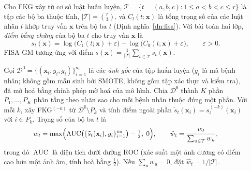 
\begin{dn}\label{dn:mm.triplescore}
Cho FKG xây từ cơ sở luật huấn luyện, $\mathcal{T}=\{t=(a,b,c): 1\le a<b<c\le r\}$ là tập các bộ ba thuộc tính,
$|\mathcal{T}|=\binom{r}{3}$, và $C_l(t;\mathbf{x})$ là tổng trọng số của các luật nhãn $l$ khớp truy vấn
$\mathbf{x}$ trên bộ ba $t$ (Định nghĩa~\ref{dn:fisa}). Với bài toán hai lớp, \emph{điểm bằng chứng} của bộ ba
$t$ cho truy vấn $\mathbf{x}$ là
\begin{equation}\label{eq:mm.triplescore}
  s_t(\mathbf{x}) = \log\bigl(C_1(t;\mathbf{x})+\varepsilon\bigr) - \log\bigl(C_0(t;\mathbf{x})+\varepsilon\bigr),
  \qquad \varepsilon>0 .
\end{equation}
FISA-GM tương ứng với điểm $s(\mathbf{x})=\frac{1}{|\mathcal{T}|}\sum_{t\in\mathcal{T}} s_t(\mathbf{x})$.
\end{dn}

\begin{dn}\label{dn:mm.tripleweight}
Gọi $\mathcal{D}^{0}=\{(\mathbf{x}_i,y_i,g_i)\}_{i=1}^{n_0}$ là các \emph{ảnh gốc} của tập huấn luyện ($g_i$ là mã
bệnh nhân; không gồm mẫu sinh bởi SMOTE, không gồm tập xác thực và kiểm tra), đã mờ hoá bằng chính phép mờ hoá
của mô hình. Chia $\mathcal{D}^{0}$ thành $K$ phần $P_1,\dots,P_K$ phân tầng theo nhãn sao cho mỗi bệnh nhân
thuộc đúng một phần. Với mỗi $k$, xây FKG$^{(-k)}$ từ $\mathcal{D}^{0}\setminus P_k$ và tính điểm ngoài phần
$\tilde s_t(\mathbf{x}_i)=s^{(-k)}_t(\mathbf{x}_i)$ với $i\in P_k$. Trọng số của bộ ba $t$ là
\begin{equation}\label{eq:mm.tripleweight}
  w_t = \max\Bigl(\operatorname{AUC}\bigl(\{\tilde s_t(\mathbf{x}_i), y_i\}_{i=1}^{n_0}\bigr) - \tfrac12,\; 0\Bigr),
  \qquad
  \hat w_t = \frac{w_t}{\sum_{u\in\mathcal{T}} w_u},
\end{equation}
trong đó $\operatorname{AUC}$ là diện tích dưới đường ROC (xác suất một ảnh dương có điểm cao hơn một ảnh âm,
tính hoà bằng $\tfrac12$). Nếu $\sum_u w_u=0$, đặt $\hat w_t = 1/|\mathcal{T}|$.
\end{dn}

